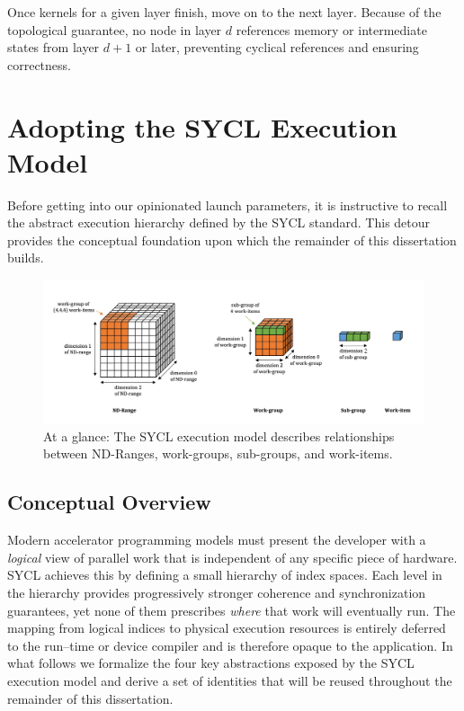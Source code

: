 Once kernels for a given layer finish, move on to the next layer. Because of the topological guarantee, no node in layer \(d\) references memory or intermediate states from layer \(d\!+\!1\) or later, preventing cyclical references and ensuring correctness.


\section{Adopting the SYCL Execution Model}

Before getting into our opinionated launch parameters, it is instructive to recall the abstract execution hierarchy defined by the SYCL standard. This detour provides the conceptual foundation upon which the remainder of this dissertation builds.

\begin{figure}[hb]
    \centering
    \includegraphics[width=1\textwidth]{figs/sycl/sycl_execution_model.png}
    \caption{At a glance: The SYCL execution model describes relationships between ND-Ranges, work-groups, sub-groups, and work-items.}
    \label{fig:sycl_exec_model}
\end{figure}

\subsection{Conceptual Overview}  Modern accelerator programming models must present the developer with a 
\emph{logical} view of parallel work that is independent of any specific piece of hardware.  SYCL achieves this
by defining a small hierarchy of index spaces.  Each level in the hierarchy provides progressively stronger 
coherence and synchronization guarantees, yet none of them prescribes 
\textit{where} that work will eventually run.  The mapping from logical indices to physical execution resources is
entirely deferred to the run--time or device compiler and is therefore opaque to the application.  In what follows we formalize the four key abstractions exposed by the SYCL execution model and derive a set of identities that will be reused throughout the remainder of this dissertation.

